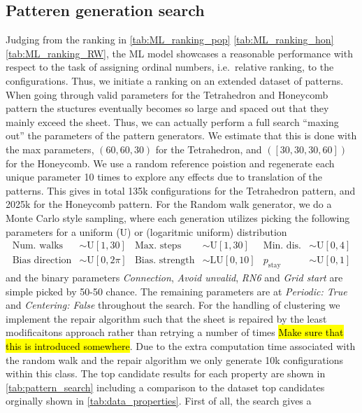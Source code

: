 \subsection{Patteren generation search}
Judging from the ranking in \cref{tab:ML_ranking_pop} \cref{tab:ML_ranking_hon}
\cref{tab:ML_ranking_RW}, the \acrshort{ML} model showcases a reasonable
performance with respect to the task of assigning ordinal numbers, i.e.\ relative
ranking, to the configurations. Thus, we initiate a ranking on an extended
dataset of patterns. When going through valid parameters for the Tetrahedron and Honeycomb pattern the stuctures eventually becomes so large and spaced out that they mainly exceed the sheet. Thus, we can actually perform a full search ``maxing out'' the parameters of the pattern generators. We estimate that this is done with the max parameters, $(60, 60, 30)$ for the Tetrahedron, and $([30, 30, 30, 60])$ for the Honeycomb. We use a random reference poistion and regenerate each unique parameter 10 times to explore any effects due to translation of the patterns. This gives in total 135k configurations for the Tetrahedron pattern,
and 2025k for the Honeycomb pattern. For the Random walk generator, we do a Monte Carlo style sampling, where each generation utilizes picking the following parameters for a uniform (U) or (logaritmic uniform) distribution
\begin{align*}
  \text{Num. walks} &\sim \text{U}[1, 30] & \text{Max. steps} &\sim \text{U}[1,30]  & \text{Min. dis.} &\sim \text{U}[0,4] \\
  \text{Bias direction} &\sim \text{U}[0, 2\pi] & \text{Bias. strength} &\sim \text{LU}[0,10]  & p_{\text{stay}} &\sim \text{U}[0,1]  
\end{align*}
and the binary parameters \textit{Connection}, \textit{Avoid unvalid},
\textit{RN6} and \textit{Grid start} are simple picked by 50-50 chance. The
remaining parameters are at \textit{Periodic: True} and \textit{Centering:
False} throughout the search. For the handling of clustering we implement the
repair algorithm such that the sheet is repaired by the least modificaitons
approach rather than retrying a number of times \hl{Make sure that this is
introduced somewhere}. Due to the extra computation time associated with the
random walk and the repair algorithm we only generate 10k configurations within
this class. The top candidate results for each property are shown in
\cref{tab:pattern_search} including a comparison to the dataset top candidates
orginally shown in \cref{tab:data_properties}. First of all, the search gives a
